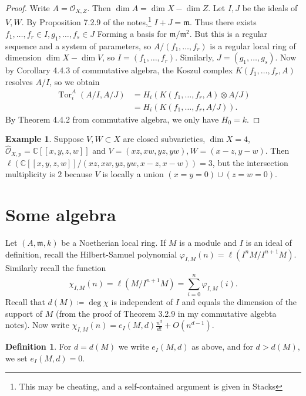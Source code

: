 \documentclass[leqno, openany]{memoir}
\theoremstyle{definition}
\newtheorem{defn}[thm]{Definition}
\newtheorem{exm}[thm]{Example}
\theoremstyle{remark}
\theoremstyle{plain}
\theoremstyle{definition}
\theoremstyle{remark}
\newcommand{\C}{\mathbb{C}}
\newcommand{\mc}[1]{\mathcal{#1}}
\newcommand{\mf}[1]{\mathfrak{#1}}
\newcommand{\wh}[1]{\widehat{#1}}
\DeclareMathOperator{\Tor}{Tor}
\begin{document}
\begin{proof} Write $A = \mc{O}_{X,Z}$. Then $\dim A = \dim X - \dim Z$. Let
    $I, J$ be the ideals of $V, W$. By Proposition 7.2.9 of the
    notes,\footnote{This may be cheating, and a self-contained argument is
    given in Stacks} $I + J = \mf{m}$. Thus there exists $f_1, \ldots, f_r \in
    I , g_1, \ldots, f_s \in J$ Forming a basis for $\mf{m}/\mf{m}^2$. But this
    is a regular sequence and a system of parameters, so $A/ (f_1, \ldots,
    f_r)$ is a regular local ring of dimension $\dim X - \dim V$, so $I = (f_1,
    \ldots, f_r)$. Similarly, $J = (g_1, \ldots, g_s)$. Now by Corollary 4.4.3
    of commutative algebra, the Koszul complex $K(f_1, \ldots, f_r, A)$
    resolves $A/I$, so we obtain \begin{align*} \Tor_i^A(A/I, A/J) &= H_i
    (K(f_1, \ldots, f_r, A) \otimes A/J) \\ &= H_i (K(f_1, \ldots, f_r, A/J)).
\end{align*} By Theorem 4.4.2 from commutative algebra, we only have $H_0 = k$.
    \end{proof}

\begin{exm} Suppose $V, W \subset X$ are closed subvarieties, $\dim X = 4$,
    $\wh{\mc{O}}_{X,p} = \C[[x,y,z,w]]$ and $V = (xz,xw,yz,yw), W = (x-z,y-w)$.
    Then $\ell(\C[[x,y,z,w]]/(xz,xw,yz,yw,x-z,x-w)) = 3$, but the intersection
    multiplicity is $2$ because $V$ is locally a union $(x=y=0) \cup (z=w=0)$.
\end{exm}

\section{Some algebra}%

Let $(A, \mf{m}, k)$ be a Noetherian local ring. If $M$ is a module and $I$ is
an ideal of definition, recall the Hilbert-Samuel polynomial $\varphi_{I,M}(n)
= \ell(I^n M / I^{n+1} M)$. Similarly recall the function \[ \chi_{I,M}(n) =
\ell(M/I^{n+1} M) = \sum_{i=0}^n \varphi_{I,M}(i). \] Recall that $d(M)
\coloneqq \deg \chi$ is independent of $I$ and equals the dimension of the
support of $M$ (from the proof of Theorem 3.2.9 in my commutative algebta
notes). Now write $\chi_{I,M}(n) = e_I(M, d) \frac{n^d}{d!} + O(n^{d-1})$.

\begin{defn} For $d = d(M)$ we write $e_I(M, d)$ as above, and for $d > d(M)$,
we set $e_I(M,d) = 0$.  \end{defn}
\end{document}

